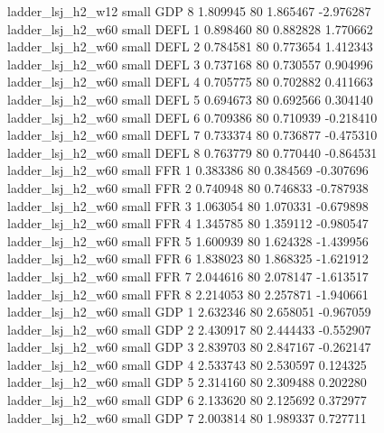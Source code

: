        ladder_lsj_h2_w12      small      GDP                 8 1.809945 80       1.865467          -2.976287
       ladder_lsj_h2_w60      small     DEFL                 1 0.898460 80       0.882828           1.770662
       ladder_lsj_h2_w60      small     DEFL                 2 0.784581 80       0.773654           1.412343
       ladder_lsj_h2_w60      small     DEFL                 3 0.737168 80       0.730557           0.904996
       ladder_lsj_h2_w60      small     DEFL                 4 0.705775 80       0.702882           0.411663
       ladder_lsj_h2_w60      small     DEFL                 5 0.694673 80       0.692566           0.304140
       ladder_lsj_h2_w60      small     DEFL                 6 0.709386 80       0.710939          -0.218410
       ladder_lsj_h2_w60      small     DEFL                 7 0.733374 80       0.736877          -0.475310
       ladder_lsj_h2_w60      small     DEFL                 8 0.763779 80       0.770440          -0.864531
       ladder_lsj_h2_w60      small      FFR                 1 0.383386 80       0.384569          -0.307696
       ladder_lsj_h2_w60      small      FFR                 2 0.740948 80       0.746833          -0.787938
       ladder_lsj_h2_w60      small      FFR                 3 1.063054 80       1.070331          -0.679898
       ladder_lsj_h2_w60      small      FFR                 4 1.345785 80       1.359112          -0.980547
       ladder_lsj_h2_w60      small      FFR                 5 1.600939 80       1.624328          -1.439956
       ladder_lsj_h2_w60      small      FFR                 6 1.838023 80       1.868325          -1.621912
       ladder_lsj_h2_w60      small      FFR                 7 2.044616 80       2.078147          -1.613517
       ladder_lsj_h2_w60      small      FFR                 8 2.214053 80       2.257871          -1.940661
       ladder_lsj_h2_w60      small      GDP                 1 2.632346 80       2.658051          -0.967059
       ladder_lsj_h2_w60      small      GDP                 2 2.430917 80       2.444433          -0.552907
       ladder_lsj_h2_w60      small      GDP                 3 2.839703 80       2.847167          -0.262147
       ladder_lsj_h2_w60      small      GDP                 4 2.533743 80       2.530597           0.124325
       ladder_lsj_h2_w60      small      GDP                 5 2.314160 80       2.309488           0.202280
       ladder_lsj_h2_w60      small      GDP                 6 2.133620 80       2.125692           0.372977
       ladder_lsj_h2_w60      small      GDP                 7 2.003814 80       1.989337           0.727711

